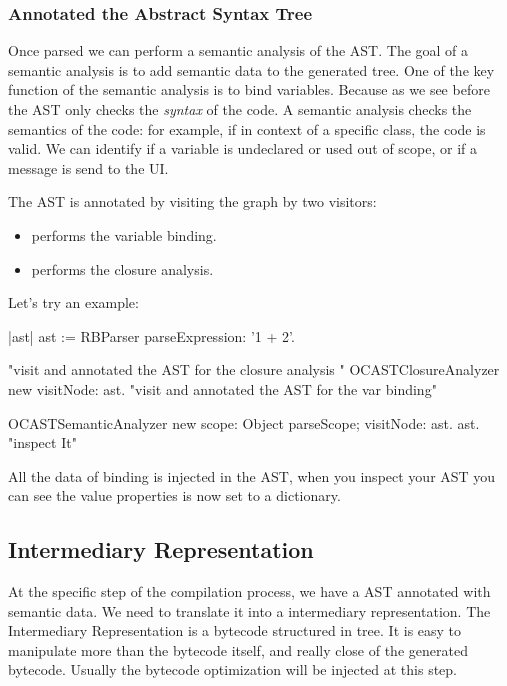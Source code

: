 \documentclass[a4paper,10pt,twoside]{book}
\begin{document}
\subsubsection{Annotated the Abstract Syntax Tree}

Once parsed we can perform a semantic analysis of the AST. The goal of a semantic analysis is to add semantic data to the generated tree. One of the key function of the semantic analysis is to bind variables. 
Because as we see before the AST only checks the \emph{syntax} of the code. A semantic analysis  checks the semantics of the code: for example, if in context of a specific class, the code is valid. We can identify if a variable is undeclared or used out of scope, or if a message is send to the UI. 

The AST is annotated by visiting the graph by two visitors:
\begin{itemize}
\item {} performs the variable binding.
\item {} performs the closure analysis.
\end{itemize}

Let's try an example:

\begin{code}{}
|ast|
ast := RBParser parseExpression: '1 + 2'.

"visit and annotated the AST for the closure analysis "
OCASTClosureAnalyzer new visitNode: ast.
"visit and annotated the AST for the var binding"

OCASTSemanticAnalyzer new
		scope: Object parseScope;
		visitNode: ast.
ast. "inspect It"
\end{code}


All the data of binding is injected in the AST, when you inspect your AST you can see the value properties is now 
set to a dictionary. 




\subsection{Intermediary Representation}
At the specific step of the compilation process, we have a AST annotated with semantic data. We need to translate it into a intermediary representation. The Intermediary Representation is a bytecode structured in tree. It is easy to manipulate more than the bytecode itself, and really close of the generated bytecode. Usually the bytecode optimization will be injected at this step.
 
\end{document}
